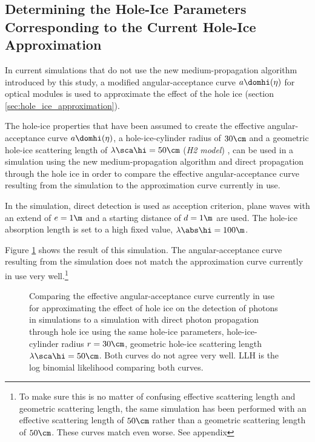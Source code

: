 
\subsection{Determining the Hole-Ice Parameters Corresponding to the Current Hole-Ice Approximation}
\label{sec:parameter_scan}

In current \clsim simulations that do not use the new medium-propagation algorithm introduced by this study, a modified angular-acceptance curve $a\domhi(\eta)$ for optical modules is used to approximate the effect of the hole ice (section \ref{sec:hole_ice_approximation}).

The hole-ice properties that have been assumed to create the effective angular-acceptance curve $a\domhi(\eta)$, a hole-ice-cylinder radius of $30\cm$ and a geometric hole-ice scattering length of $\lambda\sca\hi = 50\cm$ (\textit{H2 model}) \cite{holeicestudieswithyag}, can be used in a \clsim simulation using the new medium-propagation algorithm and direct propagation through the hole ice in order to compare the effective angular-acceptance curve resulting from the simulation to the approximation curve currently in use.


In the simulation, direct detection is used as acception criterion, plane waves with an extend of $e=1\m$ and a starting distance of $d=1\m$ are used. The hole-ice absorption length is set to a high fixed value, $\lambda\abs\hi = 100\m$.

Figure \ref{fig:chie4Ite} shows the result of this simulation. The angular-acceptance curve resulting from the simulation does not match the approximation curve currently in use very well.\footnote{To make sure this is no matter of confusing effective scattering length and geometric scattering length, the same simulation has been performed with an effective scattering length of $50\cm$ rather than a geometric scattering length of $50\cm$. These curves match even worse. See appendix }

\begin{figure}[htbp]
  \caption{Comparing the effective angular-acceptance curve currently in use for approximating the effect of hole ice on the detection of photons in simulations to a simulation with direct photon propagation through hole ice using the same hole-ice parameters, hole-ice-cylinder radius $r=30\cm$, geometric hole-ice scattering length $\lambda\sca\hi = 50\cm$. Both curves do not agree very well. LLH is the log binomial likelihood comparing both curves.}
  \label{fig:chie4Ite}
\end{figure}

